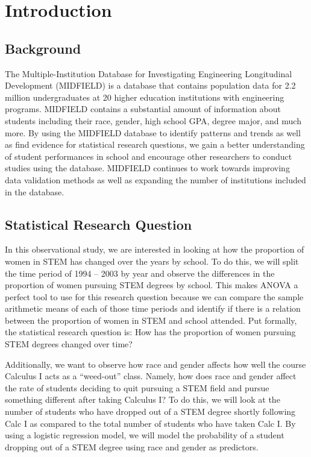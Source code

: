 \documentclass[]{article}
\begin{document}
\newpage

\section{Introduction}\label{introduction}

\subsection{Background}\label{background}

The Multiple-Institution Database for Investigating Engineering
Longitudinal Development (MIDFIELD) is a database that contains
population data for 2.2 million undergraduates at 20 higher education
institutions with engineering programs. MIDFIELD contains a substantial
amount of information about students including their race, gender, high
school GPA, degree major, and much more. By using the MIDFIELD database
to identify patterns and trends as well as find evidence for statistical
research questions, we gain a better understanding of student
performances in school and encourage other researchers to conduct
studies using the database. MIDFIELD continues to work towards improving
data validation methods as well as expanding the number of institutions
included in the database. \cite{intro}

\subsection{Statistical Research
Question}\label{statistical-research-question}

In this observational study, we are interested in looking at how the
proportion of women in STEM has changed over the years by school. To do
this, we will split the time period of 1994 -- 2003 by year and observe
the differences in the proportion of women pursuing STEM degrees by
school. This makes ANOVA a perfect tool to use for this research
question because we can compare the sample arithmetic means of each of
those time periods and identify if there is a relation between the
proportion of women in STEM and school attended. Put formally, the
statistical research question is: How has the proportion of women
pursuing STEM degrees changed over time?

Additionally, we want to observe how race and gender affects how well
the course Calculus I acts as a ``weed-out'' class. Namely, how does
race and gender affect the rate of students deciding to quit pursuing a
STEM field and pursue something different after taking Calculus I? To do
this, we will look at the number of students who have dropped out of a
STEM degree shortly following Calc I as compared to the total number of
students who have taken Calc I. By using a logistic regression model, we
will model the probability of a student dropping out of a STEM degree
using race and gender as predictors.
\end{document}
